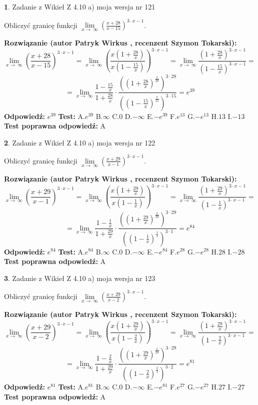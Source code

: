 \documentclass[12pt, a4paper]{article}
\theoremstyle{definition} %
\newtheorem{zad}{}
\newcommand{\zadStart}[1]{\begin{zad}#1\newline}
\newcommand{\zadStop}{\end{zad}}
\newcommand{\rozwStart}[2]{\noindent \textbf{Rozwiązanie (autor #1 , recenzent #2): }\newline}
\newcommand{\rozwStop}{\newline}
\newcommand{\odpStart}{\noindent \textbf{Odpowiedź:}\newline}
\newcommand{\odpStop}{\newline}
\newcommand{\testStart}{\noindent \textbf{Test:}\newline}
\newcommand{\testStop}{\newline}
\newcommand{\kluczStart}{\noindent \textbf{Test poprawna odpowiedź:}\newline}
\newcommand{\kluczStop}{\newline}
\begin{document}
\zadStart{Zadanie z Wikieł Z 4.10 a) moja wersja nr 121}

Obliczyć granicę funkcji  $\lim\limits_{x\to\ \infty}(\frac{x+28}{x-15})^{3\cdot x-1}$.
\zadStop
\rozwStart{Patryk Wirkus}{Szymon Tokarski}
$$\lim\limits_{x\to\ \infty}(\frac{x+28}{x-15})^{3\cdot x-1} = \lim\limits_{x\to\ \infty}(\frac{x(1+\frac{28}{x})}{x(1-\frac{15}{x})})^{3\cdot x-1}=\lim\limits_{x\to\ \infty}\frac{(1+\frac{28}{x})^{3\cdot x-1}}{(1-\frac{15}{x})^{3\cdot x-1}}=$$
$$=\lim\limits_{x\to\ \infty}\frac{1-\frac{15}{x}}{1+\frac{28}{x}}\cdot\frac{((1+\frac{28}{x})^{\frac{x}{28}})^{3\cdot28}}{((1-\frac{15}{x})^{\frac{x}{15}})^{3\cdot15}}=e^{39}$$
\rozwStop
\odpStart
$e^{39}$
\odpStop
\testStart
A.$e^{39}$ B.$\infty$ C.$0$ D.$-\infty$ E.$-e^{39}$
F.$e^{13}$ G.$-e^{13}$
H.$13$
I.$-13$
\testStop
\kluczStart
A
\kluczStop



\zadStart{Zadanie z Wikieł Z 4.10 a) moja wersja nr 122}

Obliczyć granicę funkcji  $\lim\limits_{x\to\ \infty}(\frac{x+29}{x-1})^{3\cdot x-1}$.
\zadStop
\rozwStart{Patryk Wirkus}{Szymon Tokarski}
$$\lim\limits_{x\to\ \infty}(\frac{x+29}{x-1})^{3\cdot x-1} = \lim\limits_{x\to\ \infty}(\frac{x(1+\frac{29}{x})}{x(1-\frac{1}{x})})^{3\cdot x-1}=\lim\limits_{x\to\ \infty}\frac{(1+\frac{29}{x})^{3\cdot x-1}}{(1-\frac{1}{x})^{3\cdot x-1}}=$$
$$=\lim\limits_{x\to\ \infty}\frac{1-\frac{1}{x}}{1+\frac{29}{x}}\cdot\frac{((1+\frac{29}{x})^{\frac{x}{29}})^{3\cdot29}}{((1-\frac{1}{x})^{\frac{x}{1}})^{3\cdot1}}=e^{84}$$
\rozwStop
\odpStart
$e^{84}$
\odpStop
\testStart
A.$e^{84}$ B.$\infty$ C.$0$ D.$-\infty$ E.$-e^{84}$
F.$e^{28}$ G.$-e^{28}$
H.$28$
I.$-28$
\testStop
\kluczStart
A
\kluczStop



\zadStart{Zadanie z Wikieł Z 4.10 a) moja wersja nr 123}

Obliczyć granicę funkcji  $\lim\limits_{x\to\ \infty}(\frac{x+29}{x-2})^{3\cdot x-1}$.
\zadStop
\rozwStart{Patryk Wirkus}{Szymon Tokarski}
$$\lim\limits_{x\to\ \infty}(\frac{x+29}{x-2})^{3\cdot x-1} = \lim\limits_{x\to\ \infty}(\frac{x(1+\frac{29}{x})}{x(1-\frac{2}{x})})^{3\cdot x-1}=\lim\limits_{x\to\ \infty}\frac{(1+\frac{29}{x})^{3\cdot x-1}}{(1-\frac{2}{x})^{3\cdot x-1}}=$$
$$=\lim\limits_{x\to\ \infty}\frac{1-\frac{2}{x}}{1+\frac{29}{x}}\cdot\frac{((1+\frac{29}{x})^{\frac{x}{29}})^{3\cdot29}}{((1-\frac{2}{x})^{\frac{x}{2}})^{3\cdot2}}=e^{81}$$
\rozwStop
\odpStart
$e^{81}$
\odpStop
\testStart
A.$e^{81}$ B.$\infty$ C.$0$ D.$-\infty$ E.$-e^{81}$
F.$e^{27}$ G.$-e^{27}$
H.$27$
I.$-27$
\testStop
\kluczStart
A
\kluczStop
\end{document}
